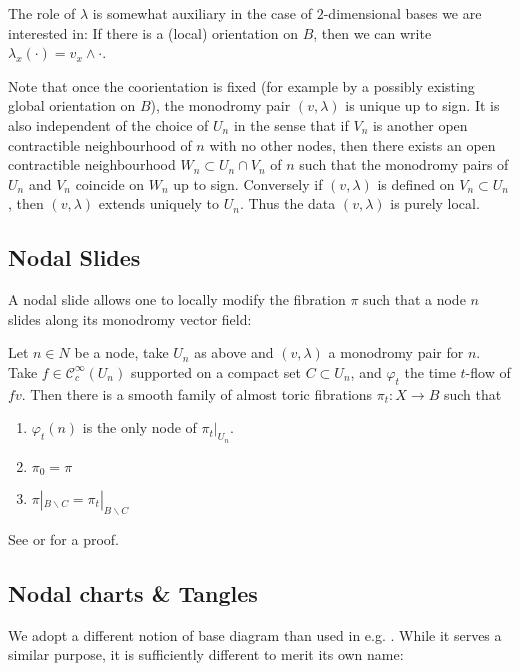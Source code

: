 \documentclass[12pt,a4paper,abstract=true,draft]{scrartcl}
\begin{document}
The role of $λ$ is somewhat auxiliary in the case of $2$-dimensional bases we are interested in: If there is a (local) orientation on $B$, then we can write $λ_x(·) = v_x ∧ ·$.

Note that once the coorientation is fixed (for example by a possibly existing global orientation on $B$), the monodromy pair $(v,λ)$ is unique up to sign.
It is also independent of the choice of $U_n$ in the sense that if $V_n$ is another open contractible neighbourhood of $n$ with no other nodes, then there exists an open contractible neighbourhood $W_n ⊂ U_n ∩ V_n$ of $n$ such that the monodromy pairs of $U_n$ and $V_n$ coincide on $W_n$ up to sign.
Conversely if $(v,λ)$ is defined on $V_n ⊂ U_n$, then $(v,λ)$ extends uniquely to $U_n$.
Thus the data $(v,λ)$ is purely local.

\subsection{Nodal Slides}
A nodal slide allows one to locally modify the fibration $π$ such that a node $n$ slides along its monodromy vector field:

\begin{lemma}
  \label{thm:nodal_slide}
  Let $n ∈ N$ be a node, take $U_n$ as above and $(v,λ)$ a monodromy pair for $n$.
  Take $f ∈ 𝒞^∞_c(U_n)$ supported on a compact set $C ⊂ U_n$, and $φ_t$ the time $t$-flow of $fv$.
  Then there is a smooth family of almost toric fibrations $π_t \colon X → B$ such that
  \begin{enumerate}
    \item $φ_t(n)$ is the only node of $π_t|_{U_n}$.
    \item $π_0 = π$
    \item $π|_{B ∖ C} = π_t|_{B ∖ C}$
  \end{enumerate}
\end{lemma}

See \cite[Theorem 6.5]{symington2002FourDF} or \cite[Theorem 8.10]{evans2021atfs} for a proof.

\subsection{Nodal charts \& Tangles}

We adopt a different notion of base diagram than used in e.g. \cite{symington2002FourDF,evans2021atfs}.
While it serves a similar purpose, it is sufficiently different to merit its own name:
\end{document}
